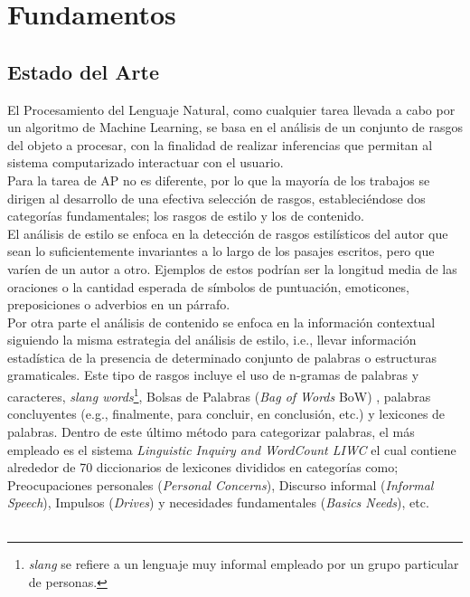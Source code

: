 
\chapter{Fundamentos}

\section{Estado del Arte}\label{SOTA}

El Procesamiento del Lenguaje Natural, como cualquier tarea llevada a cabo por un algoritmo de Machine Learning, se basa en el análisis de un conjunto de rasgos del objeto a procesar, con la finalidad de realizar inferencias que permitan al sistema computarizado interactuar con el usuario.
\\
Para la tarea de  AP no es diferente, por lo que la mayoría de los trabajos se dirigen al desarrollo de una efectiva selección de rasgos, estableciéndose dos categorías fundamentales; los rasgos de estilo y los de contenido.  
\\
El análisis de estilo se enfoca en la detección de rasgos estilísticos del autor que sean lo suficientemente invariantes a lo largo de los pasajes escritos, pero que varíen de un autor a otro. Ejemplos de estos podrían ser la longitud media de las oraciones o la cantidad esperada de símbolos de puntuación, emoticones, preposiciones o  adverbios en un párrafo.
\\
Por otra parte el análisis de contenido se enfoca en la información contextual siguiendo la misma estrategia del análisis de estilo, i.e., llevar información estadística de la presencia de determinado conjunto de palabras o estructuras gramaticales. Este tipo de rasgos incluye el uso de n-gramas de palabras y caracteres, \textit{slang words}\footnote{ \textit{slang} se refiere a un lenguaje muy informal empleado por un grupo particular de personas.}, Bolsas de Palabras (\textit{Bag of Words} BoW) \citep{DBLP:conf/clef/Pizarro19,DBLP:conf/clef/Valencia-Valencia19}, palabras concluyentes (e.g., finalmente, para concluir, en conclusión, etc.)  y lexicones de palabras.
Dentro de este último método para categorizar palabras, el más empleado es el sistema \textit{Linguistic Inquiry and WordCount LIWC} \citep{pennebaker2015development} el cual contiene alrededor de 70 diccionarios de lexicones divididos en categorías como; Preocupaciones personales (\textit{Personal Concerns}), Discurso informal (\textit{Informal Speech}), Impulsos (\textit{Drives}) y necesidades fundamentales (\textit{Basics Needs}), etc.
\\\\
